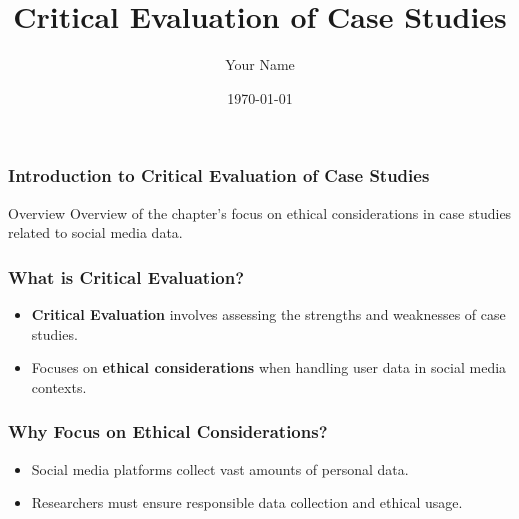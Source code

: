 \documentclass{beamer}
\title{Critical Evaluation of Case Studies}
\author{Your Name}
\institute{Your Institution}
\date{\today}
\begin{document}
\frame{\titlepage}

\begin{frame}[fragile]
    \frametitle{Introduction to Critical Evaluation of Case Studies}
    \begin{block}{Overview}
        Overview of the chapter's focus on ethical considerations in case studies related to social media data.
    \end{block}
\end{frame}

\begin{frame}[fragile]
    \frametitle{What is Critical Evaluation?}
    \begin{itemize}
        \item \textbf{Critical Evaluation} involves assessing the strengths and weaknesses of case studies.
        \item Focuses on \textbf{ethical considerations} when handling user data in social media contexts.
    \end{itemize}
\end{frame}

\begin{frame}[fragile]
    \frametitle{Why Focus on Ethical Considerations?}
    \begin{itemize}
        \item Social media platforms collect vast amounts of personal data.
        \item Researchers must ensure responsible data collection and ethical usage.
    \end{itemize}
\end{frame}
\end{document}
